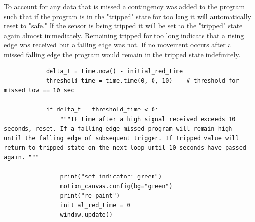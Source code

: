		\par To account for any data that is missed a contingency was added to the program such that if the program is in the "tripped" state for too long it will automatically reset to "safe." If the sensor is being tripped it will be set to the "tripped" state again almost immediately. Remaining tripped for too long indicate that a rising edge was received but a falling edge was not. If no movement occurs after a missed falling edge the program would remain in the tripped state indefinitely.
		\begin{lstlisting}
			delta_t = time.now() - initial_red_time
			threshold_time = time.time(0, 0, 10)    # threshold for missed low == 10 sec
			
			if delta_t - threshold_time < 0:
				"""IF time after a high signal received exceeds 10 seconds, reset. If a falling edge missed program will remain high until the falling edge of subsequent trigger. If tripped value will return to tripped state on the next loop until 10 seconds have passed again. """
			
				print("set indicator: green")
				motion_canvas.config(bg="green")
				print("re-paint")
				initial_red_time = 0
				window.update()
		\end{lstlisting}
		
	
